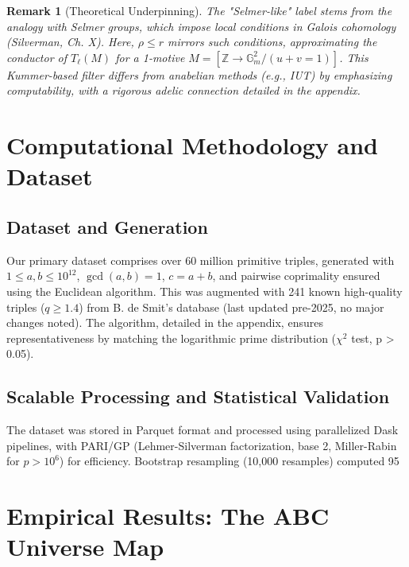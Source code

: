 \documentclass[11pt,a4paper]{article}
\newtheorem{remark}{Remark}[section]
\newcommand{\Z}{\mathbb{Z}}
\begin{document}
\begin{remark}[Theoretical Underpinning]
The "Selmer-like" label stems from the analogy with Selmer groups, which impose local conditions in Galois cohomology (Silverman, Ch. X). Here, \(\rho \leq r\) mirrors such conditions, approximating the conductor of \(T_\ell(M)\) for a 1-motive \(M = [\Z \to \mathbb{G}_m^2 / (u+v=1)]\). This Kummer-based filter differs from anabelian methods (e.g., IUT) by emphasizing computability, with a rigorous adelic connection detailed in the appendix.
\end{remark}

\section{Computational Methodology and Dataset}

\subsection{Dataset and Generation}
Our primary dataset comprises over 60 million primitive triples, generated with \(1 \leq a,b \leq 10^{12}\), \(\gcd(a,b)=1\), \(c=a+b\), and pairwise coprimality ensured using the Euclidean algorithm. This was augmented with 241 known high-quality triples (\(q \geq 1.4\)) from B. de Smit's database (last updated pre-2025, no major changes noted). The algorithm, detailed in the appendix, ensures representativeness by matching the logarithmic prime distribution (\(\chi^2\) test, p > 0.05).

\subsection{Scalable Processing and Statistical Validation}
The dataset was stored in Parquet format and processed using parallelized Dask pipelines, with PARI/GP (Lehmer-Silverman factorization, base 2, Miller-Rabin for \(p > 10^6\)) for efficiency. Bootstrap resampling (10,000 resamples) computed 95%

\section{Empirical Results: The ABC Universe Map}
\end{document}
